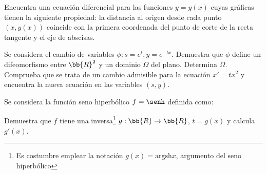 \documentclass[12pt]{article}
\begin{document}
    \begin{ejercicio}
        Encuentra una ecuación diferencial para las funciones $y=y(x)$ cuyas gráficas tienen la siguiente propiedad:
        la distancia al origen desde cada punto $(x,y(x))$ coincide con la primera coordenada del punto de corte de la recta tangente y el eje de abscisas.
    \end{ejercicio}

    \begin{ejercicio}
        Se considera el cambio de variables $\phi : s = e^t, y = e^{-tx}$. Demuestra que $\phi$ define un difeomorfismo entre $\bb{R}^2$ y un dominio $\Omega$ del plano.
        Determina $\Omega$.
        Comprueba que se trata de un cambio admisible para la ecuación $x' = tx^2$ y encuentra la nueva ecuación en las variables $(s,y)$.
    \end{ejercicio}

    \begin{ejercicio}
        Se considera la función seno hiperbólico $f=\senh$ definida como:

        Demuestra que $f$ tiene una inversa\footnote{Es costumbre emplear la notación $g(x) = \text{argsh} x$, argumento del seno hiperbólico} $g:\bb{R}\to\bb{R}$, $t=g(x)$ y calcula $g'(x)$.
    \end{ejercicio}
\end{document}
